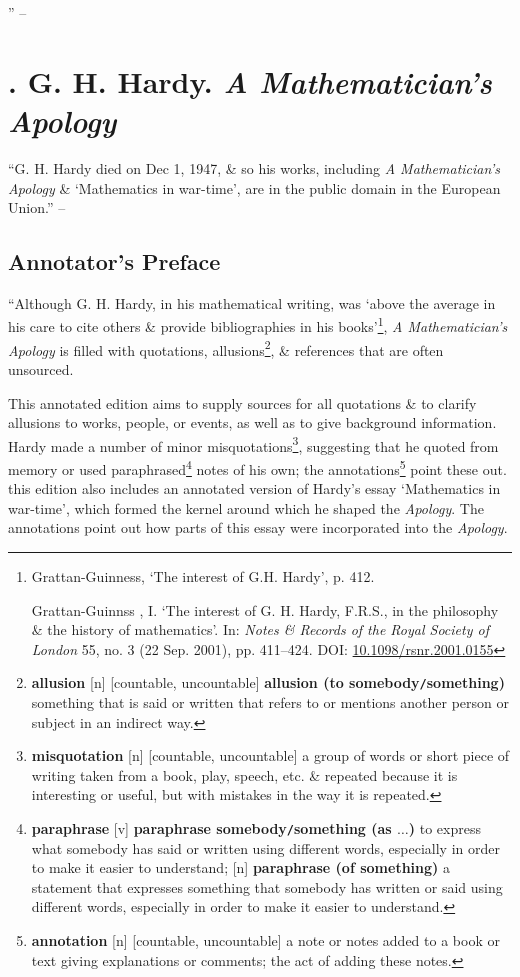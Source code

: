 \documentclass[oneside]{book}
\numberwithin{equation}{section}
\begin{document}
'' -- \cite{Grosholz2018}


\chapter{\cite{Hardy1940, Hardy1992, Hardy2022}. G. H. Hardy. \textit{A Mathematician's Apology}}

``G. H. Hardy died on Dec 1, 1947, \& so his works, including \textit{A Mathematician's Apology} \& `Mathematics in war-time', are in the public domain in the European Union.'' -- \cite[p. iii]{Hardy2022}

\section*{Annotator's Preface}
``Although G. H. Hardy, in his mathematical writing, was `above the average in his care to cite others \& provide bibliographies in his books'\footnote{Grattan-Guinness, `The interest of G.H. Hardy', p. 412.

Grattan-Guinnss , I. `The interest of G. H. Hardy, F.R.S., in the philosophy \& the history of mathematics'. In: \textit{Notes \& Records of the Royal Society of London} 55, no. 3 (22 Sep. 2001), pp. 411--424. DOI: \url{10.1098/rsnr.2001.0155}}, \textit{A Mathematician's Apology} is filled with quotations, allusions\footnote{\textbf{allusion} [n] [countable, uncountable] \textbf{allusion (to somebody\texttt{/}something)} something that is said or written that refers to or mentions another person or subject in an indirect way.}, \& references that are often unsourced.

This annotated edition aims to supply sources for all quotations \& to clarify allusions to works, people, or events, as well as to give background information. Hardy made a number of minor misquotations\footnote{\textbf{misquotation} [n] [countable, uncountable] a group of words or short piece of writing taken from a book, play, speech, etc. \& repeated because it is interesting or useful, but with mistakes in the way it is repeated.}, suggesting that he quoted from memory or used paraphrased\footnote{\textbf{paraphrase} [v] \textbf{paraphrase somebody\texttt{/}something (as $\ldots$)} to express what somebody has said or written using different words, especially in order to make it easier to understand; [n] \textbf{paraphrase (of something)} a statement that expresses something that somebody has written or said using different words, especially in order to make it easier to understand.} notes of his own; the annotations\footnote{\textbf{annotation} [n] [countable, uncountable] a note or notes added to a book or text giving explanations or comments; the act of adding these notes.} point these out. this edition also includes an annotated version of Hardy's essay `Mathematics in war-time', which formed the kernel around which he shaped the \textit{Apology}. The annotations point out how parts of this essay were incorporated into the \textit{Apology}.
\end{document}
